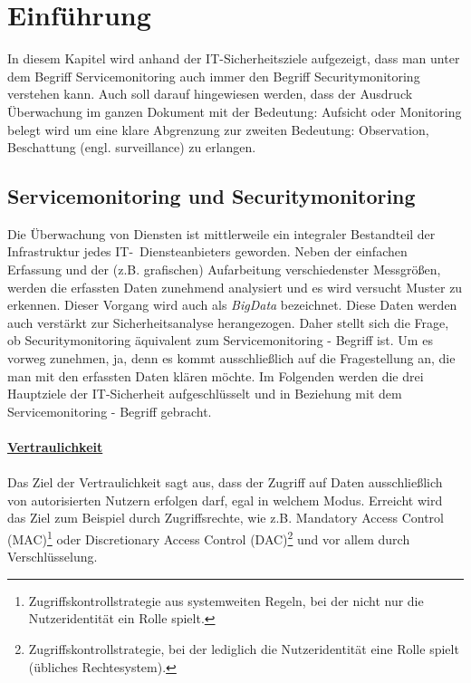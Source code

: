 \chapter{Einführung}\label{01_einf}
\thispagestyle{fancy}

In diesem Kapitel wird anhand der IT-Sicherheitsziele aufgezeigt, dass man unter dem 
Begriff Servicemonitoring auch immer den Begriff Securitymonitoring verstehen
kann. Auch soll darauf hingewiesen werden, dass der Ausdruck Überwachung im ganzen
Dokument mit der Bedeutung: Aufsicht oder Monitoring belegt wird um eine klare Abgrenzung
zur zweiten Bedeutung: Observation, Beschattung (engl. surveillance) zu erlangen.


\section{Servicemonitoring und Securitymonitoring}

Die Überwachung von Diensten ist mittlerweile ein integraler Bestandteil der 
Infrastruktur jedes IT-~Diensteanbieters geworden. Neben der einfachen Erfassung
und der (z.B. grafischen) Aufarbeitung verschiedenster Messgrößen, werden die erfassten 
Daten zunehmend analysiert und es wird versucht Muster zu erkennen. Dieser Vorgang wird 
auch als \textit{BigData} bezeichnet. Diese Daten werden auch verstärkt zur 
Sicherheitsanalyse herangezogen. Daher stellt sich die Frage, ob Securitymonitoring 
äquivalent zum Servicemonitoring - Begriff ist. Um es vorweg zunehmen, ja, denn es kommt 
ausschließlich auf die Fragestellung an, die man mit den erfassten Daten klären möchte. 
Im Folgenden werden die drei Hauptziele der IT-Sicherheit aufgeschlüsselt und in 
Beziehung mit dem Servicemonitoring - Begriff gebracht.\\\\

\underline{\textbf{Vertraulichkeit}}\\\\
Das Ziel der Vertraulichkeit sagt aus, dass der Zugriff auf Daten ausschließlich von
autorisierten Nutzern erfolgen darf, egal in welchem Modus. Erreicht wird das Ziel zum
Beispiel durch Zugriffsrechte, wie z.B. Mandatory Access Control
(MAC)\footnote{Zugriffskontrollstrategie aus systemweiten Regeln, 
bei der nicht nur die Nutzeridentität ein Rolle spielt.} oder Discretionary Access 
Control (DAC)\footnote{Zugriffskontrollstrategie, bei der lediglich die Nutzeridentität 
eine Rolle spielt (übliches Rechtesystem).} und vor allem durch Verschlüsselung.\\

